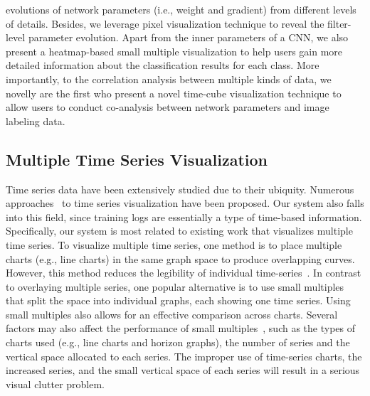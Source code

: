 \documentclass[format=acmsmall, review=false, screen=true]{acmart}
\begin{document}
{evolutions of network parameters (i.e., weight and gradient) from different levels of details. Besides, we leverage pixel visualization technique to reveal the filter-level parameter evolution. Apart from the inner parameters of a CNN, we also present a heatmap-based small multiple visualization to help users gain more detailed information about the classification results for each class. More importantly, to the correlation analysis between multiple kinds of data, we novelly are the first who present a novel time-cube visualization technique to allow users to conduct co-analysis between network parameters and image labeling data.}\subsection{Multiple Time Series Visualization}

Time series data have been extensively studied due to their ubiquity.
Numerous approaches~\cite{aigner2011visualization, aigner2008visual, bach2014review} to time series visualization have been proposed.
Our system also falls into this field, since training logs are essentially a type of time-based information.
Specifically, our system is most related to existing work that visualizes multiple time series.
To visualize multiple time series, one method is to place multiple charts (e.g., line charts) in the same graph space to produce overlapping curves. However, this method reduces the legibility of individual time-series~\cite{javed2010graphical}.
In contrast to overlaying multiple series, one popular alternative is to use small multiples~\cite{tufte1983visual} that split the space into individual graphs, each showing one time series. Using small multiples also allows for an effective comparison across charts. Several factors may also affect the performance of small multiples~\cite{heer2009sizing,javed2010graphical}, such as the types of charts used (e.g., line charts and horizon graphs), the number of series and the vertical space allocated to each series. The improper use of time-series charts, the increased series, and the small vertical space of each series will result in a serious visual clutter problem.
\end{document}
